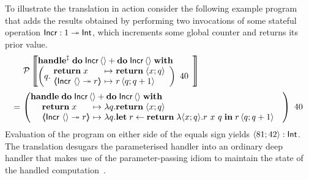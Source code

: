 \documentclass[12pt,phd,lfcs,twoside,openright,logo,leftchapter,normalheadings]{infthesis}
\theoremstyle{plain}
\theoremstyle{definition}
\begin{document}
To illustrate the translation in action consider the following example
program that adds the results obtained by performing two invocations
of some stateful operation $\mathsf{Incr} : 1 \twoheadrightarrow \mathsf{Int}$, which
increments some global counter and returns its prior value.
%
\[
  \ba{@{~}l@{~}l}
  &\mathcal{P}\left\llbracket
    \ba[m]{@{}l}
      \ParamHandle\;\Do\;\dec{Incr}\,\Unit + \Do\;\dec{Incr}\,\Unit\;\With\\
      \left( q.\ba[m]{@{~}l@{~}c@{~}l}
                \Return\;x &\mapsto& \Return\;\Record{x;q}\\
                \OpCase{\dec{Incr}}{\Unit}{r} &\mapsto& r\,\Record{q;q+1}
            \ea\right)~40
    \ea
  \right\rrbracket \medskip\\
  =& \left(
       \ba[m]{@{}l}
       \Handle\;\Do\;\dec{Incr}\,\Unit + \Do\;\dec{Incr}\,\Unit\;\With\\
           \quad\ba[t]{@{~}l@{~}c@{~}l}
                 \Return\;x &\mapsto& \lambda q.\Return\;\Record{x;q}\\
                 \OpCase{\dec{Incr}}{\Unit}{r} &\mapsto& \lambda q. \Let\;r \revto \Return\;\lambda\Record{x;q}.r~x~q\;\In\;r\,\Record{q;q+1}
           \ea
     \ea\right)~40
  \ea
\]
%
Evaluation of the program on either side of the equals sign yields
$\langle 81;42 \rangle : \mathsf{Int}$. The translation desugars the parameterised
handler into an ordinary deep handler that makes use of the
parameter-passing idiom to maintain the state of the handled
computation~\cite{Pretnar15}.
\end{document}
